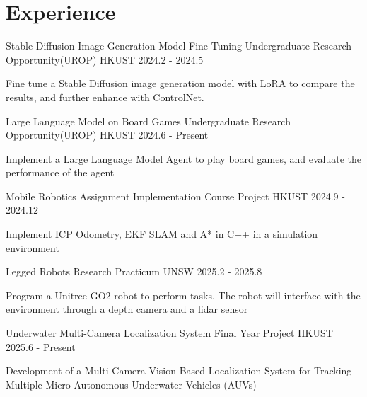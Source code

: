 \section{Experience}
\cventry
{Stable Diffusion Image Generation Model Fine Tuning} %
{Undergraduate Research Opportunity(UROP)} %
{HKUST} %
{2024.2 - 2024.5} %
\begin{cvitems}
\item {Fine tune a Stable Diffusion image generation model with LoRA to compare the results, and further enhance with ControlNet.}
\end{cvitems}

\cventry
{Large Language Model on Board Games} %
{Undergraduate Research Opportunity(UROP)} %
{HKUST} %
{2024.6 - Present} %
\begin{cvitems}
\item {Implement a Large Language Model Agent to play board games, and evaluate the performance of the agent}
\end{cvitems}

\cventry
{Mobile Robotics Assignment Implementation} %
{Course Project} %
{HKUST} %
{2024.9 - 2024.12} %
\begin{cvitems}
\item {Implement ICP Odometry, EKF SLAM and A* in C++ in a simulation environment}
\end{cvitems}

\cventry
{Legged Robots} %
{Research Practicum} %
{UNSW} %
{2025.2 - 2025.8} %
\begin{cvitems}
\item {Program a Unitree GO2 robot to perform tasks. The robot will interface with the environment through a depth camera and a lidar sensor}
\end{cvitems}

\cventry
{Underwater Multi-Camera Localization System} %
{Final Year Project} %
{HKUST} %
{2025.6 - Present} %
\begin{cvitems}
\item {Development of a Multi-Camera Vision-Based Localization System for Tracking Multiple Micro Autonomous Underwater Vehicles (AUVs)}
\end{cvitems}